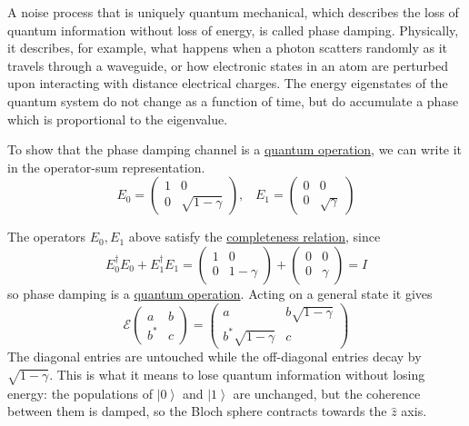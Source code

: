 \documentclass{article}
\newcommand{\ket}[1]{\ensuremath{\left|#1\right\rangle}}
\newcounter{definition}[section]
\newcounter{example}[section]
\begin{document}
    A noise process that is uniquely quantum mechanical, which describes the loss of quantum information without loss of energy, is called phase damping. Physically, it describes, for example, what happens when a photon scatters randomly as it travels through a waveguide, or how electronic states in an atom are perturbed upon interacting with distance electrical charges. The energy eigenstates of the quantum system do not change as a function of time, but do accumulate a phase which is proportional to the eigenvalue. 

    \begin{definition}
      \label{def:phase-damping-channel}
      To show that the phase damping channel is a \hyperref[def:quantum-operation]{quantum operation}, we can write it in the operator-sum representation. 
      \begin{equation}
        E_0 = \begin{pmatrix} 1 & 0 \\ 0 & \sqrt{1 - \gamma} \end{pmatrix}, \;\;\; E_1 = \begin{pmatrix} 0 & 0 \\ 0 & \sqrt{\gamma} \end{pmatrix}
      \end{equation}
    \end{definition}

    \begin{lemma}
      \label{thm:operator-sum-representation-of-phase-damping}
      The operators $E_0, E_1$ above satisfy the \hyperref[thm:completeness-relation]{completeness relation}, since
      \begin{equation}
        E_0^\dagger E_0 + E_1^\dagger E_1 = \begin{pmatrix} 1 & 0 \\ 0 & 1 - \gamma \end{pmatrix} + \begin{pmatrix} 0 & 0 \\ 0 & \gamma \end{pmatrix} = I
      \end{equation}
      so phase damping is a \hyperref[def:quantum-operation]{quantum operation}. Acting on a general state it gives
      \begin{equation}
        \mathcal{E} \begin{pmatrix} a & b \\ b^\ast & c \end{pmatrix} = \begin{pmatrix} a & b \sqrt{1 - \gamma} \\ b^\ast \sqrt{1-\gamma} & c \end{pmatrix}
      \end{equation}
      The diagonal entries are untouched while the off-diagonal entries decay by $\sqrt{1-\gamma}$. This is what it means to lose quantum information without losing energy: the populations of $\ket{0}$ and $\ket{1}$ are unchanged, but the coherence between them is damped, so the Bloch sphere contracts towards the $\hat{z}$ axis. 
    \end{lemma}
\end{document}
